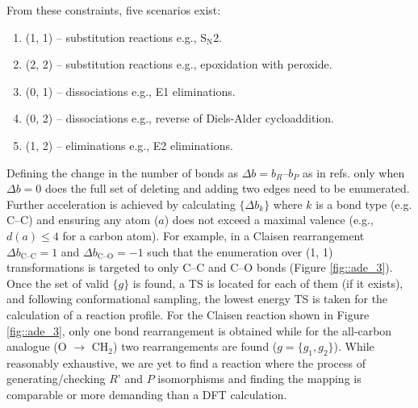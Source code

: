 \documentclass[../../main.tex]{subfiles}
\begin{document}
\newpage
From these constraints, five scenarios exist: 

\begin{enumerate}[label=\Roman*.]
	\item (1, 1) – substitution reactions e.g., S${}_\text{N}$2.
	\item (2, 2) – substitution reactions e.g., epoxidation with peroxide.
	\item (0, 1) – dissociations e.g., E1 eliminations.
	\item (0, 2) – dissociations e.g., reverse of Diels-Alder cycloaddition.
	\item 	(1, 2) – eliminations e.g., E2 eliminations.
\end{enumerate}

Defining the change in the number of bonds as $\Delta b = b_R – b_P$ as in refs. \cite{Jacobson2017,Crabtree2009} only when $\Delta b = 0$ does the full set of deleting and adding two edges need to be enumerated. Further acceleration is achieved by calculating $\{\Delta b_k\}$ where $k$ is a bond type (e.g. C--C) and ensuring any atom ($a$) does not exceed a maximal valence (e.g., $d(a) \le 4$ for a carbon atom). For example, in a Claisen rearrangement $\Delta b_\text{C--C} = 1$ and $\Delta b_\text{C--O} = -1$ such that the enumeration over (1, 1) transformations is targeted to only C–C and C–O bonds (Figure \ref{fig::ade_3}). Once the set of valid $\{g\}$ is found, a TS is located for each of them (if it exists), and following conformational sampling, the lowest energy TS is taken for the calculation of a reaction profile. For the Claisen reaction shown in Figure \ref{fig::ade_3}, only one bond rearrangement is obtained while for the all-carbon analogue (O $\rightarrow$ CH$_2$) two rearrangements are found ($g = \{g_1, g_2\}$). While reasonably exhaustive, we are yet to find a reaction where the process of generating/checking $R’$ and $P$ isomorphisms and finding the mapping is comparable or more demanding than a DFT calculation.
\end{document}
